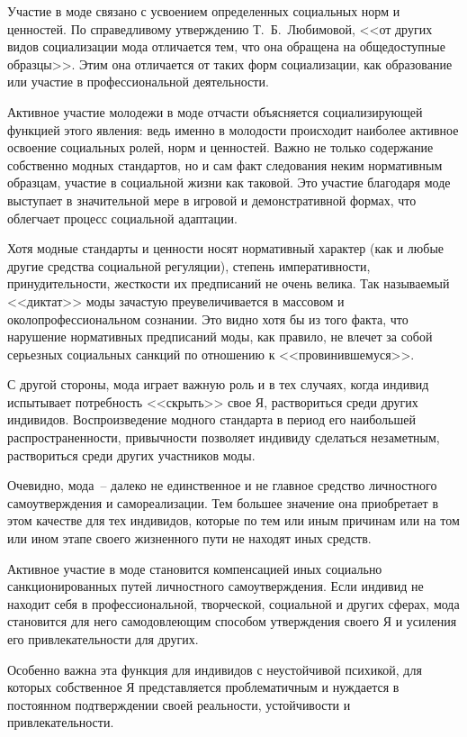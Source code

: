   Участие в моде связано с усвоением определенных социальных норм и ценностей.
  По справедливому утверждению Т.~Б.~Любимовой, <<от других видов социализации
  мода отличается тем, что она обращена на общедоступные образцы>>. Этим она
  отличается от таких форм социализации, как образование или участие в
  профессиональной деятельности.
  
  Активное участие молодежи в моде отчасти объясняется социализирующей функцией
  этого явления: ведь именно в молодости происходит наиболее активное освоение
  социальных ролей, норм и ценностей. Важно не только содержание собственно
  модных стандартов, но и сам факт следования неким нормативным образцам,
  участие в социальной жизни как таковой. Это участие благодаря моде выступает в
  значительной мере в игровой и демонстративной формах, что облегчает процесс
  социальной адаптации.
  
  Хотя модные стандарты и ценности носят нормативный характер (как и любые
  другие средства социальной регуляции), степень императивности,
  принудительности, жесткости их предписаний не очень велика. Так называемый
  <<диктат>> моды зачастую преувеличивается в массовом и околопрофессиональном
  сознании. Это видно хотя бы из того факта, что нарушение нормативных
  предписаний моды, как правило, не влечет за собой серьезных социальных санкций
  по отношению к <<провинившемуся>>.
  
  С другой стороны, мода играет важную роль и в тех случаях, когда индивид
  испытывает потребность <<скрыть>> свое Я, раствориться среди других индивидов.
  Воспроизведение модного стандарта в период его наибольшей распространенности,
  привычности позволяет индивиду сделаться незаметным, раствориться среди других
  участников моды.
  
  Очевидно, мода~-- далеко не единственное и не главное средство личностного
  самоутверждения и самореализации. Тем большее значение она приобретает в этом
  качестве для тех индивидов, которые по тем или иным причинам или на том или
  ином этапе своего жизненного пути не находят иных средств.
  
  Активное участие в моде становится компенсацией иных социально
  санкционированных путей личностного самоутверждения. Если индивид не находит
  себя в профессиональной, творческой, социальной и других сферах, мода
  становится для него самодовлеющим способом утверждения своего Я и усиления его
  привлекательности для других.
  
  Особенно важна эта функция для индивидов с неустойчивой психикой, для которых
  собственное Я представляется проблематичным и нуждается в постоянном
  подтверждении своей реальности, устойчивости и привлекательности.
  
